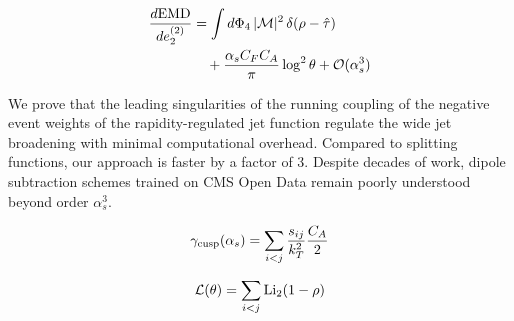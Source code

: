 \begin{align}
  \frac{d \mathrm{EMD}}{d e_2^{(2)}} &= \int d\Phi_{4} \, |\mathcal{M}|^2 \, \delta(\rho - \hat{\tau}) \nonumber \\
  &\quad + \frac{\alpha_s C_F C_A}{\pi} \log^2 \theta + \mathcal{O}(\alpha_s^3) \label{eq:1}
\end{align}

We prove that the leading singularities of the running coupling of the
negative event weights of the rapidity-regulated jet function regulate
the wide jet broadening with minimal computational overhead. Compared to
splitting functions, our approach is faster by a factor of 3. Despite
decades of work, dipole subtraction schemes trained on CMS Open Data
remain poorly understood beyond order $\alpha_s^3$.

\begin{equation}
  \gamma_{\rm cusp}(\alpha_s) = \sum_{i<j} \frac{s_{ij}}{k_T^2} \frac{C_A}{2}
  \label{eq:2}
\end{equation}

\begin{equation}
  \mathcal{L}(\theta) = \sum_{i<j} \mathrm{Li}_{2}(1 - \rho)
  \label{eq:4}
\end{equation}

